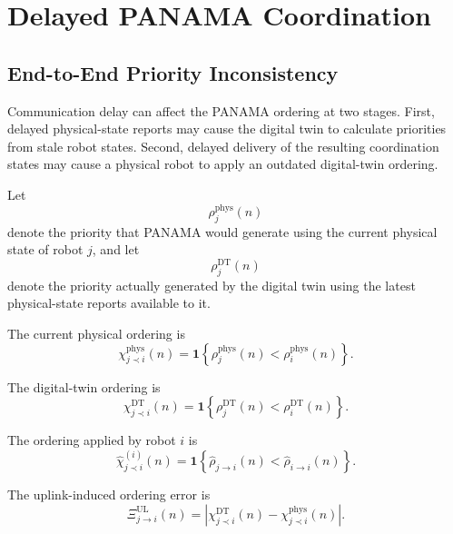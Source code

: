 \IfFileExists{IEEEtran.cls}{\documentclass[conference]{IEEEtran}}{\documentclass[10pt,twocolumn]{article}}
\begin{document}
\section{Delayed PANAMA Coordination}
\subsection{End-to-End Priority Inconsistency}
\label{subsec:end_to_end_priority_inconsistency}

Communication delay can affect the PANAMA ordering at two stages. First, delayed physical-state reports may cause the digital twin to calculate priorities from stale robot states. Second, delayed delivery of the resulting coordination states may cause a physical robot to apply an outdated digital-twin ordering.

Let
\begin{equation}
    \rho_j^{\mathrm{phys}}(n)
\end{equation}
denote the priority that PANAMA would generate using the current physical state of robot \(j\), and let
\begin{equation}
    \rho_j^{\mathrm{DT}}(n)
\end{equation}
denote the priority actually generated by the digital twin using the latest physical-state reports available to it.

The current physical ordering is
\begin{equation}
    \chi_{j\prec i}^{\mathrm{phys}}(n)
    =
    \mathbf{1}
    \left\{
        \rho_j^{\mathrm{phys}}(n)
        <
        \rho_i^{\mathrm{phys}}(n)
    \right\}.
    \label{eq:physical_priority_relation}
\end{equation}

The digital-twin ordering is
\begin{equation}
    \chi_{j\prec i}^{\mathrm{DT}}(n)
    =
    \mathbf{1}
    \left\{
        \rho_j^{\mathrm{DT}}(n)
        <
        \rho_i^{\mathrm{DT}}(n)
    \right\}.
    \label{eq:dt_priority_relation}
\end{equation}

The ordering applied by robot \(i\) is
\begin{equation}
    \widehat{\chi}_{j\prec i}^{(i)}(n)
    =
    \mathbf{1}
    \left\{
        \widehat{\rho}_{j\rightarrow i}(n)
        <
        \widehat{\rho}_{i\rightarrow i}(n)
    \right\}.
    \label{eq:perceived_priority_relation}
\end{equation}

The uplink-induced ordering error is
\begin{equation}
    \Xi_{j\rightarrow i}^{\mathrm{UL}}(n)
    =
    \left|
        \chi_{j\prec i}^{\mathrm{DT}}(n)
        -
        \chi_{j\prec i}^{\mathrm{phys}}(n)
    \right|.
    \label{eq:uplink_ordering_error}
\end{equation}
\end{document}
